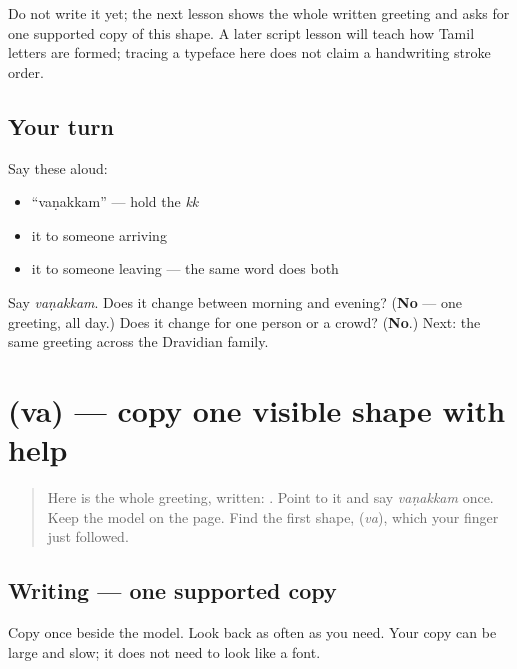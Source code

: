 Do not write it yet; the next lesson shows the whole written greeting and asks for one supported copy of this shape. A later script lesson will teach how Tamil letters are formed; tracing a typeface here does not claim a handwriting stroke order.

\subsection*{Your turn}
Say these aloud:

\begin{itemize}
\raggedright
  \item \textquotedblleft{}vaṇakkam\textquotedblright{} — hold the \emph{kk}
  \item it to someone arriving
  \item it to someone leaving — the same word does both
\end{itemize}

\begin{tcolorbox}[breakable,colback=teal!4,colframe=teal!35!black,title={Before you move on}]
Say \emph{vaṇakkam}. Does it change between morning and evening? (\textbf{No} — one greeting, all day.) Does it change for one person or a crowd? (\textbf{No}.) Next: the same greeting across the Dravidian family.
\end{tcolorbox}
\section[\texorpdfstring{\ta{வ} (va)}{வ (va)}]{ (va) — copy one visible shape with help}

\label{lesson:TA-W00-va-guided-copy}



\begin{quote}
Here is the whole greeting, written: \textbf{}. Point to it and say \emph{vaṇakkam} once. Keep the model on the page. Find the first shape, \textbf{} (\emph{va}), which your finger just followed.
\end{quote}

\subsection*{Writing — one supported copy}

Copy \textbf{} once beside the model. Look back as often as you need. Your copy can be large and slow; it does not need to look like a font.

